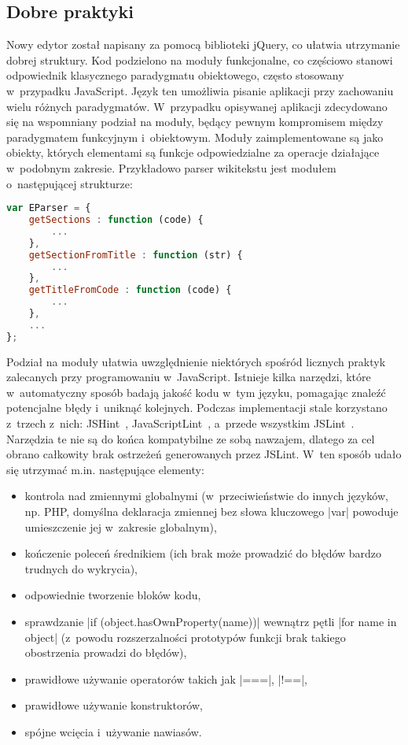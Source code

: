 \subsection{Dobre praktyki}
Nowy edytor został napisany za pomocą biblioteki jQuery, co ułatwia utrzymanie dobrej struktury. Kod podzielono na moduły funkcjonalne, co częściowo stanowi odpowiednik klasycznego paradygmatu obiektowego, często stosowany w~przypadku JavaScript. Język ten umożliwia pisanie aplikacji przy zachowaniu wielu różnych paradygmatów. W~przypadku opisywanej aplikacji zdecydowano się na wspomniany podział na moduły, będący pewnym kompromisem między paradygmatem funkcyjnym i~obiektowym. Moduły zaimplementowane są jako obiekty, których elementami są funkcje odpowiedzialne za operacje działające w~podobnym zakresie. Przykładowo parser wikitekstu jest modułem o~następującej strukturze:
\begin{lstlisting}[language=JavaScript,caption=Ogólna struktura modułu JavaScript]
var EParser = {
	getSections : function (code) {
		...
	},
	getSectionFromTitle : function (str) {
		...
	},
	getTitleFromCode : function (code) {
		...
	},
	...
};
\end{lstlisting}
Podział na moduły ułatwia uwzględnienie niektórych spośród licznych praktyk zalecanych przy programowaniu w~JavaScript. Istnieje kilka narzędzi, które w~automatyczny sposób badają jakość kodu w~tym języku, pomagając znaleźć potencjalne błędy i~uniknąć kolejnych. Podczas implementacji stale korzystano z~trzech z~nich: JSHint~\cite{jshint:doc}, JavaScriptLint~\cite{javascriptlint:doc}, a~przede wszystkim JSLint~\cite{jslint:doc}. Narzędzia te nie są do końca kompatybilne ze sobą nawzajem, dlatego za cel obrano całkowity brak ostrzeżeń generowanych przez JSLint. W~ten sposób udało się utrzymać m.in. następujące elementy:
\begin{itemize}
	\item kontrola nad zmiennymi globalnymi (w~przeciwieństwie do innych języków, np. PHP, domyślna deklaracja zmiennej bez słowa kluczowego \kod|var| powoduje umieszczenie jej w~zakresie globalnym),
	\item kończenie poleceń średnikiem (ich brak może prowadzić do błędów bardzo trudnych do wykrycia),
	\item odpowiednie tworzenie bloków kodu,
	\item sprawdzanie \kod|if (object.hasOwnProperty(name))| wewnątrz pętli \kod|for name in object| (z~powodu rozszerzalności prototypów funkcji brak takiego obostrzenia prowadzi do błędów),
	\item prawidłowe używanie operatorów takich jak \kod|===|, \kod|!==|,
	\item prawidłowe używanie konstruktorów,
	\item spójne wcięcia i~używanie nawiasów.
\end{itemize}

